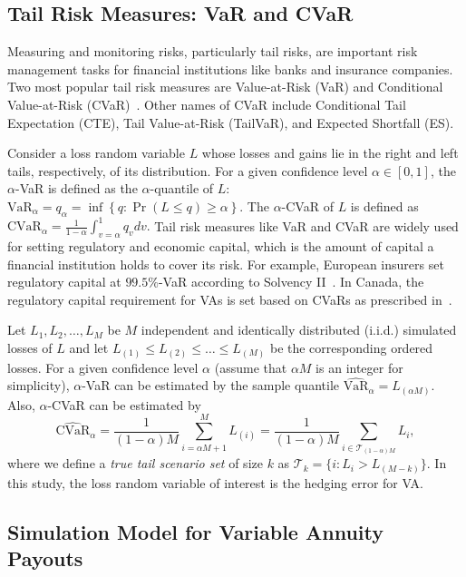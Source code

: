 \documentclass[]{article}
\newcommand{\VaR}{\mbox{VaR}}
\newcommand{\CVaR}{\mbox{CVaR}}
\newcommand{\tail}{\mathcal{T}}
\begin{document}
\subsection{Tail Risk Measures: VaR and CVaR}
Measuring and monitoring risks, particularly tail risks, are important risk management tasks for financial institutions like banks and insurance companies.
Two most popular tail risk measures are Value-at-Risk (VaR) and Conditional Value-at-Risk (CVaR)~\citep{rockafellar2002conditional}. Other names of CVaR include Conditional Tail Expectation (CTE), Tail Value-at-Risk (TailVaR), and Expected Shortfall (ES).

Consider a loss random variable $L$ whose losses and gains lie in the right and left tails, respectively, of its distribution.
For a given confidence level $\alpha\in [0,1]$, the $\alpha$-VaR is defined as the $\alpha$-quantile of $L$:
$
    \VaR_\alpha = q_\alpha = \inf \left\{ q: \Pr(L\leq q) \geq \alpha \right\}.
$
The $\alpha$-CVaR of $L$ is defined as
$
    \CVaR_\alpha =\frac{1}{1-\alpha} \int_{v=\alpha}^{1} q_v dv.
$
Tail risk measures like VaR and CVaR are widely used for setting regulatory and economic capital, which is the amount of capital a financial institution holds to cover its risk.
For example, European insurers set regulatory capital at $99.5\%$-VaR according to Solvency II~\cite{eiopa2014underlying}.
In Canada, the regulatory capital requirement for VAs is set based on CVaRs as prescribed in~\cite{osfi2017life}.

Let $L_1,L_2,\ldots,L_M$ be $M$ independent and identically distributed (i.i.d.) simulated losses of $L$ and let $L_{(1)}\leq L_{(2)}\leq \ldots\leq L_{(M)}$ be the corresponding ordered losses.
For a given confidence level $\alpha$ (assume that $\alpha M$ is an integer for simplicity), $\alpha$-VaR can be estimated by the sample quantile $\widehat{\VaR}_\alpha = L_{(\alpha M)}$. Also, $\alpha$-CVaR can be estimated by
\begin{equation*}
    \widehat{\CVaR}_\alpha = \frac{1}{(1-\alpha)M} \sum_{i=\alpha M + 1}^{M}L_{(i)} = \frac{1}{(1-\alpha)M} \sum_{i \in \tail_{(1-\alpha )M}}L_{i},
\end{equation*}
where we define a \textit{true tail scenario set} of size $k$ as $\tail_{k} = \{i: L_i > L_{(M-k)}\}$.
In this study, the loss random variable of interest is the hedging error for VA.

\subsection{Simulation Model for Variable Annuity Payouts}\label{subsec:VApayout}
\end{document}
